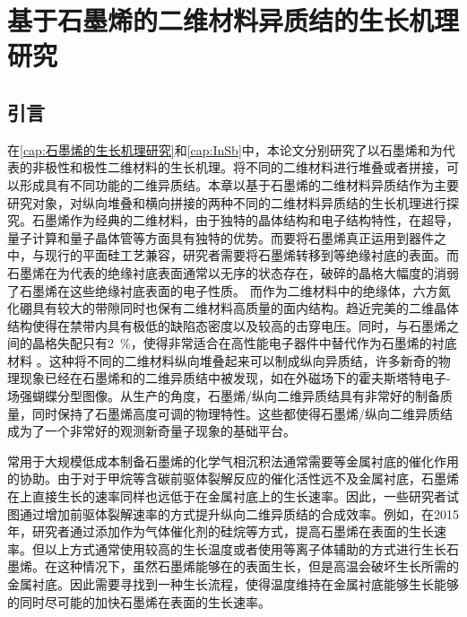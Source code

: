 \chapter{基于石墨烯的二维材料异质结的生长机理研究}
\section{引言}
在\ref{cap:石墨烯的生长机理研究}和\ref{cap:InSb}中，本论文分别研究了以石墨烯和为代表的非极性和极性二维材料的生长机理。将不同的二维材料进行堆叠或者拼接，可以形成具有不同功能的二维异质结。本章以基于石墨烯的二维材料异质结作为主要研究对象，对纵向堆叠和横向拼接的两种不同的二维材料异质结的生长机理进行探究。石墨烯作为经典的二维材料，由于独特的晶体结构和电子结构特性，在超导，量子计算和量子晶体管等方面具有独特的优势。而要将石墨烯真正运用到器件之中，与现行的平面硅工艺兼容，研究者需要将石墨烯转移到等绝缘衬底的表面。而石墨烯在为代表的绝缘衬底表面通常以无序的状态存在，破碎的晶格大幅度的消弱了石墨烯在这些绝缘衬底表面的电子性质。
而作为二维材料中的绝缘体，六方氮化硼具有较大的带隙同时也保有二维材料高质量的面内结构。趋近完美的二维晶体结构使得在禁带内具有极低的缺陷态密度以及较高的击穿电压。同时，与石墨烯之间的晶格失配只有\SI{2}{\percent}，使得非常适合在高性能电子器件中替代作为石墨烯的衬底材料 。这种将不同的二维材料纵向堆叠起来可以制成纵向异质结，许多新奇的物理现象已经在石墨烯和的二维异质结中被发现，如在外磁场下的霍夫斯塔特电子-场强蝴蝶分型图像。从生产的角度，石墨烯/纵向二维异质结具有非常好的制备质量，同时保持了石墨烯高度可调的物理特性。这些都使得石墨烯/纵向二维异质结成为了一个非常好的观测新奇量子现象的基础平台。

常用于大规模低成本制备石墨烯的化学气相沉积法通常需要等金属衬底的催化作用的协助。由于对于甲烷等含碳前驱体裂解反应的催化活性远不及金属衬底，石墨烯在上直接生长的速率同样也远低于在金属衬底上的生长速率。因此，一些研究者试图通过增加前驱体裂解速率的方式提升纵向二维异质结的合成效率。例如，在2015年，研究者通过添加作为气体催化剂的硅烷等方式，提高石墨烯在表面的生长速率。但以上方式通常使用较高的生长温度或者使用等离子体辅助的方式进行生长石墨烯。在这种情况下，虽然石墨烯能够在的表面生长，但是高温会破坏生长所需的金属衬底。因此需要寻找到一种生长流程，使得温度维持在金属衬底能够生长能够的同时尽可能的加快石墨烯在表面的生长速率。

